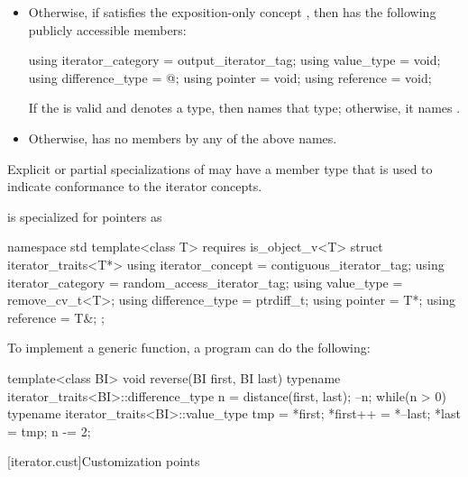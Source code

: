 \begin{itemize}
\item
Otherwise, if  satisfies the exposition-only concept
, then 
has the following publicly accessible
members:
\begin{codeblock}
  using iterator_category = output_iterator_tag;
  using value_type        = void;
  using difference_type   = @\seebelow@;
  using pointer           = void;
  using reference         = void;
\end{codeblock}
If the 
 is valid and denotes a type,
then  names that type; otherwise, it names .

\item
Otherwise, 
has no members by any of the above names.
\end{itemize}

\pnum
Explicit or partial specializations of  may
have a member type  that is used to indicate
conformance to the iterator concepts.

\pnum
{} is specialized for pointers as

\begin{codeblock}
namespace std {
  template<class T>
    requires is_object_v<T>
  struct iterator_traits<T*> {
    using iterator_concept  = contiguous_iterator_tag;
    using iterator_category = random_access_iterator_tag;
    using value_type        = remove_cv_t<T>;
    using difference_type   = ptrdiff_t;
    using pointer           = T*;
    using reference         = T&;
  };
}
\end{codeblock}

\pnum
\begin{example}
To implement a generic
function, a \Cpp{} program can do the following:

\begin{codeblock}
template<class BI>
void reverse(BI first, BI last) {
  typename iterator_traits<BI>::difference_type n =
    distance(first, last);
  --n;
  while(n > 0) {
    typename iterator_traits<BI>::value_type
     tmp = *first;
    *first++ = *--last;
    *last = tmp;
    n -= 2;
  }
}
\end{codeblock}
\end{example}

[iterator.cust]{Customization points}

